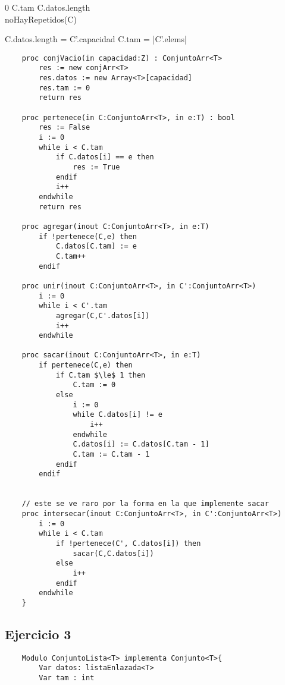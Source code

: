 \documentclass[10pt,a4paper]{article}
\begin{document}
{0 \le C.tam \le C.datos.length \\
\land noHayRepetidos(C)}

{}

{C.datos.length = C'.capacidad \land C.tam = |C'.elems|\\ 
}

{}

\begin{lstlisting}
	proc conjVacio(in capacidad:Z) : ConjuntoArr<T>
		res := new conjArr<T>
		res.datos := new Array<T>[capacidad]
		res.tam := 0
		return res

	proc pertenece(in C:ConjuntoArr<T>, in e:T) : bool
		res := False
		i := 0
		while i < C.tam
			if C.datos[i] == e then
				res := True
			endif
			i++
		endwhile
		return res

	proc agregar(inout C:ConjuntoArr<T>, in e:T) 
		if !pertenece(C,e) then
			C.datos[C.tam] := e
			C.tam++
		endif

	proc unir(inout C:ConjuntoArr<T>, in C':ConjuntoArr<T>)
		i := 0
		while i < C'.tam
			agregar(C,C'.datos[i])
			i++
		endwhile

	proc sacar(inout C:ConjuntoArr<T>, in e:T)
		if pertenece(C,e) then
			if C.tam $\le$ 1 then
				C.tam := 0
			else
				i := 0 
				while C.datos[i] != e
					i++
				endwhile
				C.datos[i] := C.datos[C.tam - 1]
				C.tam := C.tam - 1
			endif
		endif


	// este se ve raro por la forma en la que implemente sacar
	proc intersecar(inout C:ConjuntoArr<T>, in C':ConjuntoArr<T>) 
		i := 0 
		while i < C.tam
			if !pertenece(C', C.datos[i]) then
				sacar(C,C.datos[i])
			else
				i++
			endif
		endwhile
	}
\end{lstlisting}

\subsection{Ejercicio 3}

\begin{lstlisting}
	Modulo ConjuntoLista<T> implementa Conjunto<T>{
		Var datos: listaEnlazada<T>
		Var tam : int
		
\end{lstlisting}
\end{document}
